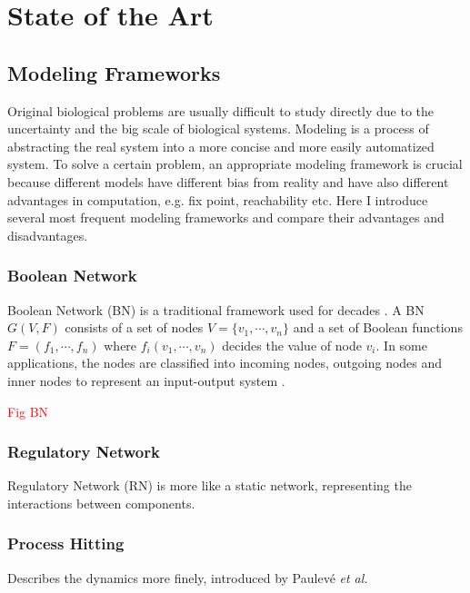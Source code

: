\chapter{State of the Art}

\section{Modeling Frameworks}
Original biological problems are usually difficult to study directly due to the uncertainty and the big scale of biological systems. 
Modeling is a process of abstracting the real system into a more concise and more easily automatized system.
To solve a certain problem, an appropriate modeling framework is crucial because different models have different bias from reality and have also different advantages in computation, e.g. fix point, reachability etc.
Here I introduce several most frequent modeling frameworks and compare their advantages and disadvantages.
\subsection{Boolean Network}
Boolean Network (BN) is a traditional framework used for decades \cite{kauffman1969}.
A BN $G(V,F)$ consists of a set of nodes $V=\{v_1,\cdots,v_n\}$ and a set of Boolean functions $F=(f_1,\cdots,f_n)$ where $f_i(v_1,\cdots,v_n)$ decides the value of node $v_i$.
In some applications, the nodes are classified into incoming nodes, outgoing nodes and inner nodes to represent an input-output system \cite{akutsu2007control}.

\textcolor{red}{Fig BN}
\subsection{Regulatory Network}
Regulatory Network (RN) is more like a static network, representing the interactions between components.
\subsection{Process Hitting}
Describes the dynamics more finely, introduced by Paulev\'e \textit{et al.} \cite{pauleve2011}
